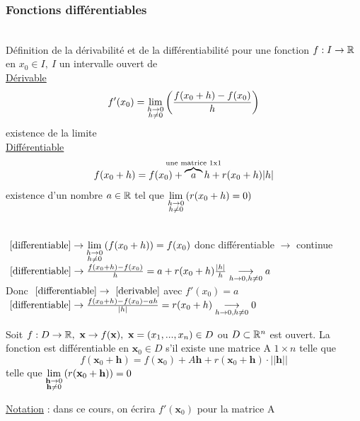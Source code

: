 \documentclass[12pt,a4paper]{article}
\begin{document}
\subsubsection{Fonctions différentiables}
\begin{boite}
	\\
	Définition de la dérivabilité et de la différentiabilité pour une fonction $f:I\to \mathbb{R}$ en $x_0 \in I,\ I$ un intervalle ouvert de \R\\
	\underline{Dérivable}
	\begin{equation}
		f'(x_0)  = \lim\limits_{\substack{h\to 0 \\ h\neq 0}}\left(\frac{f(x_0 + h) - f(x_0)}{h}\right)
		\label{derivable}
	\end{equation}
	existence de la limite\\
	\underline{Différentiable} 
	\begin{equation}
		f(x_0+h) = f(x_0) + \overbrace{a}^{\mathclap{\text{une matrice 1x1}}}h + r(x_0 + h) |h|
		\label{differentiable}
	\end{equation}
	existence d'un nombre $a\in \mathbb{R}$ tel que $\lim\limits_{\substack{h\to 0 \\ h\neq 0}}\left(r(x_0+h) = 0\right)$
\end{boite}
\\
$~\eqref{differentiable} \to \lim\limits_{\substack{h\to 0 \\ h\neq 0}}\left(f(x_0+h)\right) = f(x_0)$ donc différentiable $\to$ continue\\
$~\eqref{differentiable} \to \frac{f(x_0+h) - f(x_0)}{h} = a + r(x_0+h)\frac{|h|}{h} \underset{h\to 0, h\neq 0}{\longrightarrow} a$\\
Donc $~\eqref{differentiable} \to ~\eqref{derivable}$ avec $f'(x_0) = a$\\
$~\eqref{differentiable} \to \frac{f(x_0+h) - f(x_0) - ah}{|h|} = r(x_0 + h) \underset{h\to 0, h\neq 0}{\longrightarrow} 0$\\
\begin{boite}
	 Soit $f:D\to \mathbb{R},\ \textbf{x} \to f(\textbf{x}),\ \textbf{x} = (x_1,...,x_n) \in D$ ou $D \subset \mathbb{R}^n$ est ouvert. La fonction est différentiable en $\textbf{x}_0 \in D$ s'il existe une matrice A $1\times n$ telle que
	\begin{equation*}
		f(\textbf{x}_0 + \textbf{h}) = f(\textbf{x}_0) + A\textbf{h} + r(\textbf{x}_0 + \textbf{h}) \cdot ||\textbf{h}||
	\end{equation*}
	telle que $\lim\limits_{\substack{\textbf{h} \to 0 \\ \textbf{h} \neq 0}}\left(r(\textbf{x}_0 + \textbf{h})\right)  =0$
\end{boite}
\begin{boite}
	\underline{Notation} : dans ce cours, on écrira $f'(\textbf{x}_0)$ pour la matrice A
\end{boite}
\end{document}

